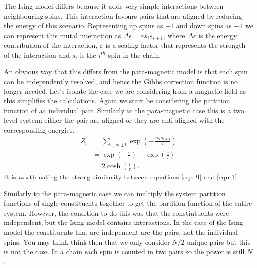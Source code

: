 \documentclass[a4paper]{article}
\begin{document}
\begin{multicols}{2}
        The Ising model differs because it adds very simple interactions %
        between neighbouring spins. This interaction favours pairs that %
        are aligned by reducing the energy of this scenario. Representing %
        up spins as \(+1\) and down spins as \(-1\) we can represent this %
        mutal interaction as \(\Delta \epsilon = \varepsilon s_{i}s_{i + 1}\), %
        where \(\Delta \epsilon\) is the energy contribution of the %
        interaction, \(\varepsilon\) is a scaling factor that represents %
        the strength of the interaction and \(s_{i}\) is the \(i^{th}\) %
        spin in the chain. 


        An obvious way that this differs from the para-magnetic model %
        is that each spin can be independently resolved, and hence %
        the Gibbs correction function is no longer needed. Let's isolate %
        the case we are considering from a magnetic field as this simplifies %
        the calculations. Again we start be considering the partition %
        function of an individual pair. Similarly to the para-magnetic case %
        this is a two level system; either the pair are aligned or they %
        are anti-aligned with the corresponding energies.
        \begin{align}
            Z_{i} &= \sum_{s_{i} = \pm 1}
                    \exp\left(-\frac{\varepsilon s_{i}s_{i+1}}{\tau}\right)
                    \nonumber\\
                &= \exp\left(-\frac{\varepsilon}{\tau}\right) +
                    \exp\left(\frac{\varepsilon}{\tau}\right)
                    \nonumber\\
                &= 2\cosh\left(\frac{\varepsilon}{\tau}\right).
           \label{eqn:9}
        \end{align}
        It is worth noting the strong similarity between equations %
        \ref{eqn:9} and \ref{eqn:1}. 


        Similarly to the para-magnetic case we can multiply the system %
        partition functions of single constituents together to get the %
        partition function of the entire system. However, the condition %
        to do this was that the constiutuents were independent, but the %
        Ising model contains interactions. In the case of the Ising model %
        the constituents that are independent are the pairs, not the %
        individual spins. You may think think then that we only consider %
        \(N / 2\) unique pairs but this is not the case. In a chain each %
        spin is counted in two pairs so the power is still \(N\). 



\end{multicols}
\end{document}
